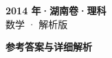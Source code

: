 \documentclass[zihao=-4, a4paper]{ctexart}
\begin{document}
\begin{center}
  {\Large\bfseries 2014 年·湖南卷·理科}\\[4pt]
  {\large 数学 · 解析版}
\end{center}
\medskip
{}

\clearpage
{}
\begin{center}{\Large\bfseries 参考答案与详细解析}\end{center}
\medskip

\end{document}
